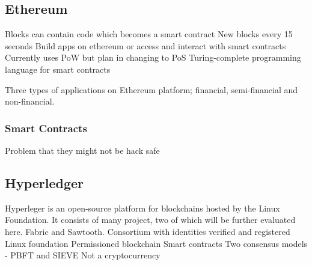 \subsection{Ethereum}
Blocks can contain code which becomes a smart contract
New blocks every 15 seconds
Build apps on ethereum or access and interact with smart contracts 
Currently uses PoW but plan in changing to PoS
Turing-complete programming language for smart contracts

Three types of applications on Ethereum platform; financial, semi-financial and non-financial. 

\subsubsection*{Smart Contracts}
Problem that they might not be hack safe 

\subsection{Hyperledger}
Hyperleger is an open-source platform for blockchains hosted by the Linux Foundation. It consists of many project, two of which will be further evaluated here. Fabric and Sawtooth. 
Consortium with identities verified and registered
Linux foundation
Permissioned blockchain
Smart contracts
Two consensus models - PBFT and SIEVE
Not a cryptocurrency 



